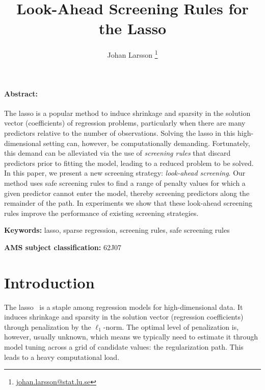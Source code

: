 \documentclass[b5paper,10pt,abstractoff,DIV=calc,headings=normal,twoside]{scrartcl}
\makeatletter
\newcommand{\shortauthor}{}
\newcommand{\shorttitle}{\@title}
\def\AMS#1{\par\noindent \textbf{AMS subject classification: }#1\par}
\newcommand{\keywords}[1]{\par\noindent\textbf{Keywords: }#1}
\theoremstyle{plain}
\theoremstyle{definition}
\theoremstyle{remark}
\renewenvironment{abstract}{\bigskip\noindent\begin{minipage}{\textwidth}\setlength{\parindent}{15pt}\paragraph{Abstract:}}{\end{minipage}}
\makeatother
\begin{document}

\renewcommand{\shortauthor}{J. Larsson}

\title{Look-Ahead Screening Rules for the Lasso}

\author[1]{Johan Larsson%
  \thanks{%
    \href{mailto:johan.larsson@stat.lu.se}{\url{johan.larsson@stat.lu.se}}
  }%
}

\maketitle

\begin{abstract}
  The lasso is a popular method to induce shrinkage and sparsity in the
  solution vector (coefficients) of regression problems, particularly
  when there are many predictors relative to the number of observations. Solving
  the lasso in this high-dimensional setting can, however, be computationally
  demanding. Fortunately, this demand can be alleviated via the
  use of \emph{screening rules} that discard predictors prior to
  fitting the model, leading to a reduced problem to be solved.
  In this paper, we present a new screening strategy: \emph{look-ahead
    screening}. Our method uses safe screening rules to find a range of
  penalty values for which a given predictor cannot enter the model,
  thereby screening predictors along the remainder of the path.
  In experiments we show that these look-ahead screening rules improve the
  performance of existing screening strategies.
\end{abstract}

\keywords{lasso, sparse regression, screening rules, safe screening rules}

\smallskip

\AMS{62J07}

\section{Introduction}\label{sec:introduction}

The lasso~\cite{tibshirani1996} is a staple among regression models for
high-dimensional data. It induces shrinkage and sparsity in the solution
vector (regression coefficients) through penalization by the
\(\ell_1\)-norm. The optimal level of penalization is, however, usually
unknown, which means we typically need to estimate it through model tuning
across a grid of candidate values: the regularization path. This leads to a
heavy computational load.
\end{document}
